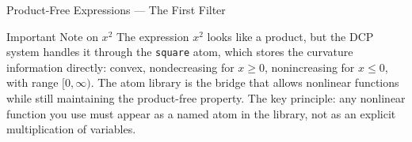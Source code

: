\documentclass[aspectratio=169,10pt]{beamer}
\begin{document}
\begin{frame}[allowframebreaks]{Product-Free Expressions --- The First Filter}
  \begin{block}{Important Note on $x^2$}
    The expression $x^2$ looks like a product, but the DCP system
    handles it through the \texttt{square} atom, which stores the
    curvature information directly: convex, nondecreasing for $x \geq 0$,
    nonincreasing for $x \leq 0$, with range $[0, \infty)$.  The atom
    library is the bridge that allows nonlinear functions while still
    maintaining the product-free property.  The key principle: any
    nonlinear function you use must appear as a named atom in the
    library, not as an explicit multiplication of variables.
  \end{block}

\end{frame}

\end{document}
